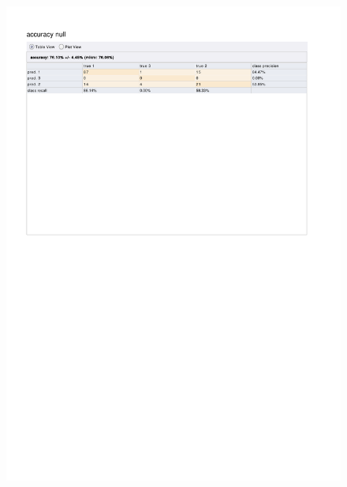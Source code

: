 \begin{figure}[htp]
  \centerline{\includegraphics[trim=0 680 0 80,clip,width=16.09cm]{results/ANN_A_Excitement.pdf}} \caption{
} \label{ANN_A_Excitement}
\end{figure}

